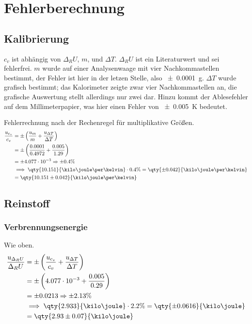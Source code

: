 \section{Fehlerberechnung}
\subsection{Kalibrierung}

$c_v$ ist abhängig von $\Delta_R U$, $m$, und $\Delta T$.
$\Delta_R U$ ist ein Literaturwert und sei fehlerfrei.
$m$ wurde auf einer Analysenwaage mit vier Nachkommastellen bestimmt, der Fehler ist hier in der letzen Stelle, also \qty{\pm 0.0001}{\gram}.
$\Delta T$ wurde grafisch bestimmt; das Kalorimeter zeigte zwar vier Nachkommastellen an, die grafische Auswertung stellt allerdings nur zwei dar.
Hinzu kommt der Ablesefehler auf dem Millimeterpapier, was hier einen Fehler von \qty{\pm 0.005}{\kelvin} bedeutet.

Fehlerrechnung nach der Rechenregel für multiplikative Größen.\autocite{skript-physika}
\begin{align*}
    \frac{u_{c_v}}{c_v} &= \pm \left( \frac{u_m}{m} + \frac{u_{\Delta T}}{\Delta T} \right) \\
                      &= \pm \left( \frac{0.0001}{0.4972} + \frac{0.005}{1.29} \right) \\
                      &= \pm 4.077 \cdot 10^{-3} \Rightarrow \pm 0.4\% \\
                      &\implies \qty{10.151}{\kilo\joule\per\kelvin} \cdot 0.4\% = \qty{\pm 0.042}{\kilo\joule\per\kelvin} \\
                      &= \qty{10.151 \pm 0.042}{\kilo\joule\per\kelvin}
\end{align*}

\subsection{Reinstoff}
\subsubsection{Verbrennungsenergie}
Wie oben.
\begin{align*}
    \frac{u_{\Delta_R U}}{\Delta_R U} &= \pm \left( \frac{u_{c_v}}{c_v} + \frac{u_{\Delta T}}{\Delta T} \right) \\
                                      &= \pm \left( 4.077 \cdot 10^{-3} + \frac{0.005}{0.29} \right) \\
                                      &= \pm 0.0213 \Rightarrow \pm 2.13\% \\
                                      &\implies \qty{2.933}{\kilo\joule} \cdot 2.2\% = \qty{\pm 0.0616}{\kilo\joule} \\
                                      &= \qty{2.93 \pm 0.07}{\kilo\joule}
\end{align*}
